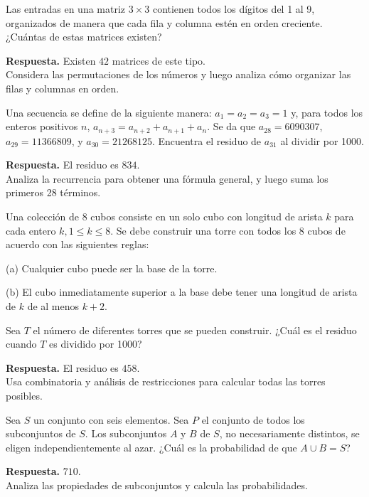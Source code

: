 \documentclass[11pt]{scrartcl}
\begin{document}
\begin{problem}[AMC 2010]
Las entradas en una matriz \(3 \times 3\) contienen todos los dígitos del 1 al 9, organizados de manera que cada fila y columna estén en orden creciente. ¿Cuántas de estas matrices existen?
\begin{hint}
\textbf{Respuesta.} Existen \( 42 \) matrices de este tipo.\\
Considera las permutaciones de los números y luego analiza cómo organizar las filas y columnas en orden.
\end{hint}
\end{problem}

\begin{problem}[AIME 2004]
Una secuencia se define de la siguiente manera: \( a_1 = a_2 = a_3 = 1 \) y, para todos los enteros positivos \( n \), \( a_{n+3} = a_{n+2} + a_{n+1} + a_n \). Se da que \( a_{28} = 6090307 \), \( a_{29} = 11366809 \), y \( a_{30} = 21268125 \). Encuentra el residuo de \( a_{31} \) al dividir por 1000.
\begin{hint}
\textbf{Respuesta.} El residuo es \( 834 \). \\
Analiza la recurrencia para obtener una fórmula general, y luego suma los primeros 28 términos.
\end{hint}
\end{problem}

\begin{problem}[AIME 2006]
Una colección de 8 cubos consiste en un solo cubo con longitud de arista \( k \) para cada entero \( k, 1 \leq k \leq 8 \). Se debe construir una torre con todos los 8 cubos de acuerdo con las siguientes reglas:

(a) Cualquier cubo puede ser la base de la torre.

(b) El cubo inmediatamente superior a la base debe tener una longitud de arista de \( k \) de al menos \( k + 2 \).

Sea \( T \) el número de diferentes torres que se pueden construir. ¿Cuál es el residuo cuando \( T \) es dividido por 1000?
\begin{hint}
\textbf{Respuesta.} El residuo es \( 458 \).\\
Usa combinatoria y análisis de restricciones para calcular todas las torres posibles.
\end{hint}
\end{problem}

\begin{problem}[AIME 2007]
Sea \( S \) un conjunto con seis elementos. Sea \( P \) el conjunto de todos los subconjuntos de \( S \). Los subconjuntos \( A \) y \( B \) de \( S \), no necesariamente distintos, se eligen independientemente al azar. ¿Cuál es la probabilidad de que \( A \cup B = S \)?
\begin{hint}
\textbf{Respuesta.} \( 710 \).\\
Analiza las propiedades de subconjuntos y calcula las probabilidades.
\end{hint}
\end{problem}
\end{document}
